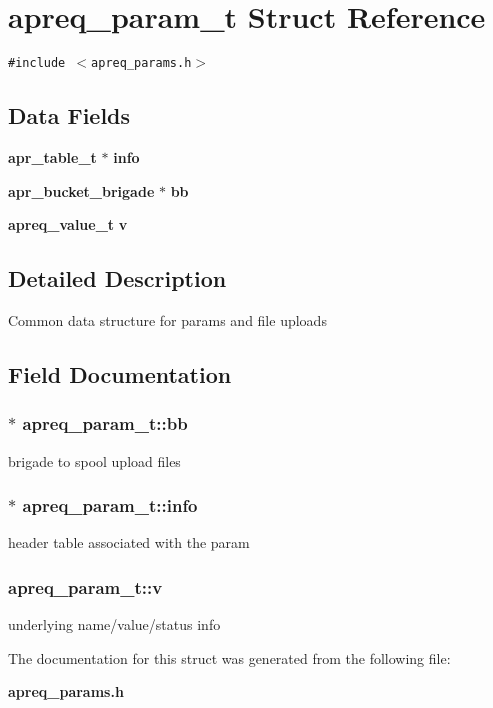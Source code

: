 \section{apreq\_\-param\_\-t  Struct Reference}
\label{structapreq__param__t}
{\tt \#include $<$apreq\_\-params.h$>$}

\subsection*{Data Fields}
\begin{CompactItemize}
\item 
{\bf apr\_\-table\_\-t} $\ast$ {\bf info}
\item 
{\bf apr\_\-bucket\_\-brigade} $\ast$ {\bf bb}
\item 
{\bf apreq\_\-value\_\-t} {\bf v}
\end{CompactItemize}


\subsection{Detailed Description}
Common data structure for params and file uploads 



\subsection{Field Documentation}
\subsubsection{$\ast$ apreq\_\-param\_\-t::bb}\label{structapreq__param__t_m1}


brigade to spool upload files 
\subsubsection{$\ast$ apreq\_\-param\_\-t::info}\label{structapreq__param__t_m0}


header table associated with the param 
\subsubsection{ apreq\_\-param\_\-t::v}\label{structapreq__param__t_m2}


underlying name/value/status info 

The documentation for this struct was generated from the following file:\begin{CompactItemize}
\item 
{\bf apreq\_\-params.h}\end{CompactItemize}
